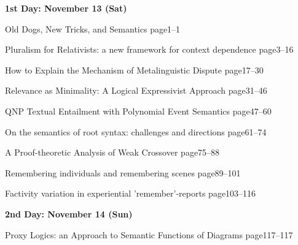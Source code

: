 \documentclass[12pt]{jarticle}
\begin{document}
\noindent\textbf{\large 
1st Day: November 13 (Sat)
}\\







  
     {Old Dogs, New Tricks, and Semantics}
     {page1--1}




  
     {Pluralism for Relativists: a new framework for context dependence}
     {page3--16}
  
     {How to Explain the Mechanism of Metalinguistic Dispute}
     {page17--30}
  
     {Relevance as Minimality: A Logical Expressivist Approach}
     {page31--46}




  
     {QNP Textual Entailment with Polynomial Event Semantics}
     {page47--60}
  
     {On the semantics of root syntax: challenges and directions}
     {page61--74}
  
     {A Proof-theoretic Analysis of Weak Crossover}
     {page75--88}




  
  
     {Remembering individuals and remembering scenes}
     {page89--101}
  
     {Factivity variation in experiential 'remember'-reports}
     {page103--116}




\noindent\textbf{\large 
2nd Day: November 14 (Sun)
}\\



  
     {Proxy Logics: an Approach to Semantic Functions of Diagrams}
     {page117--117}



\end{document}
